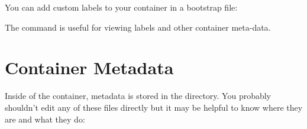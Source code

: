 \documentclass[letterpaper,10pt,english]{sphinxmanual}
\begin{document}
%
\begin{sphinxVerbatim}[commandchars=\\\{\}]
    

 


        

        

        

\end{sphinxVerbatim}

You can add custom labels to your container in a bootstrap file:

%
\begin{sphinxVerbatim}[commandchars=\\\{\}]
 

  




 
\end{sphinxVerbatim}

The  command is useful for viewing labels and other container meta-data.


\section{Container Metadata}
\label{\detokenize{environment_and_metadata:container-metadata}}
Inside of the container, metadata is stored in the  directory. You
probably shouldn’t edit any of these files directly but it may be
helpful to know where they are and what they do:
\end{document}
